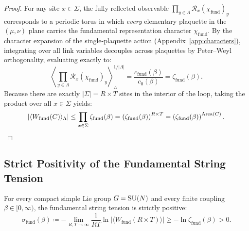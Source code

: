 \begin{proof}
For any site $x \in \Sigma$, the fully reflected observable $\prod_{y \in \Lambda} \mathcal{R}_x(\chi_{\mathrm{fund}})_y$ corresponds to a periodic torus in which \emph{every} elementary plaquette in the $(\mu, \nu)$ plane carries the fundamental representation character $\chi_{\mathrm{fund}}$.
By the character expansion of the single-plaquette action (Appendix~\ref{app:characters}), integrating over all link variables decouples across plaquettes by Peter--Weyl orthogonality, evaluating exactly to:
\begin{equation}
\left\langle \prod_{y \in \Lambda} \mathcal{R}_x(\chi_{\mathrm{fund}})_y \right\rangle_\Lambda^{1/|\Lambda|} = \frac{c_{\mathrm{fund}}(\beta)}{c_0(\beta)} = \zeta_{\mathrm{fund}}(\beta).
\end{equation}
Because there are exactly $|\Sigma| = R \times T$ sites in the interior of the loop, taking the product over all $x \in \Sigma$ yields:
\begin{equation}
\left| \langle W_{\mathrm{fund}}(C) \rangle_\Lambda \right| \le \prod_{x \in \Sigma} \zeta_{\mathrm{fund}}(\beta) = \left( \zeta_{\mathrm{fund}}(\beta) \right)^{R \times T} = \left( \zeta_{\mathrm{fund}}(\beta) \right)^{\mathrm{Area}(C)}. \qedhere
\end{equation}
\end{proof}

\subsection{Strict Positivity of the Fundamental String Tension}
\label{subsec:string_tension_strictly_positive}

\begin{corollary}
\label{cor:string_tension_strictly_positive}
For every compact simple Lie group $G = \mathrm{SU}(N)$ and every finite coupling $\beta \in [0, \infty)$, the fundamental string tension is strictly positive:
\begin{equation}
\label{eq:string_tension_lower_bound_app}
\sigma_{\mathrm{fund}}(\beta) \coloneqq -\lim_{R, T \to \infty} \frac{1}{R T} \ln \left| \langle W_{\mathrm{fund}}(R \times T) \rangle \right| \ge -\ln \zeta_{\mathrm{fund}}(\beta) > 0.
\end{equation}
\end{corollary}

